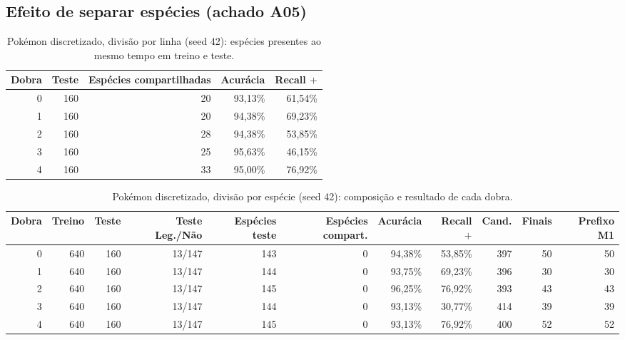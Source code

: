 \documentclass[a4paper,11pt]{article}
\begin{document}
\subsection{Efeito de separar esp\'ecies (achado A05)}
\begin{table}[htbp]
\centering
\small
\caption{Pokémon discretizado, divisão por linha (seed 42): espécies presentes ao mesmo tempo em treino e teste.}
\label{tab:folds_linha}
\begin{tabular}{rrrrr}
\toprule
Dobra & Teste & Espécies compartilhadas & Acurácia & Recall $+$ \\
\midrule
0 & 160 & 20 & 93,13\% & 61,54\% \\
1 & 160 & 20 & 94,38\% & 69,23\% \\
2 & 160 & 28 & 94,38\% & 53,85\% \\
3 & 160 & 25 & 95,63\% & 46,15\% \\
4 & 160 & 33 & 95,00\% & 76,92\% \\
\bottomrule
\end{tabular}
\end{table}

\begin{table}[htbp]
\centering
\small
\caption{Pokémon discretizado, divisão por espécie (seed 42): composição e resultado de cada dobra.}
\label{tab:folds_pokemon}
\begin{tabular}{rrrrrrrrrrr}
\toprule
Dobra & Treino & Teste & Teste Leg./Não & Espécies teste & Espécies compart. & Acurácia & Recall $+$ & Cand. & Finais & Prefixo M1 \\
\midrule
0 & 640 & 160 & 13/147 & 143 & 0 & 94,38\% & 53,85\% & 397 & 50 & 50 \\
1 & 640 & 160 & 13/147 & 144 & 0 & 93,75\% & 69,23\% & 396 & 30 & 30 \\
2 & 640 & 160 & 13/147 & 145 & 0 & 96,25\% & 76,92\% & 393 & 43 & 43 \\
3 & 640 & 160 & 13/147 & 144 & 0 & 93,13\% & 30,77\% & 414 & 39 & 39 \\
4 & 640 & 160 & 13/147 & 145 & 0 & 93,13\% & 76,92\% & 400 & 52 & 52 \\
\bottomrule
\end{tabular}
\end{table}
\end{document}
